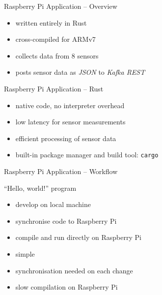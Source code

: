 \begin{frame}{Raspberry Pi Application -- Overview}
  \begin{itemize}
    \item written entirely in Rust
    \item cross-compiled for ARMv7
    \item collects data from 8 sensors
    \item posts sensor data as \textit{JSON} to \textit{Kafka REST}
  \end{itemize}
\end{frame}

\begin{frame}{Raspberry Pi Application -- Rust}
  \begin{itemize}
    \item native code, no interpreter overhead
    \item low latency for sensor measurements
    \item efficient processing of sensor data
    \item built-in package manager and build tool: \texttt{cargo}
  \end{itemize}
\end{frame}

\begin{frame}{Raspberry Pi Application -- Workflow}
  \begin{block}{“Hello, world!” program}
    \begin{itemize}
      \item develop on local machine
      \item synchronise code to Raspberry Pi
      \item compile and run directly on Raspberry Pi
    \end{itemize}
  \end{block}
  \begin{block}{}
    \begin{itemize}
      \item simple
    \end{itemize}
  \end{block}
  \begin{block}{}
    \begin{itemize}
      \item synchronisation needed on each change
      \item slow compilation on Raspberry Pi
    \end{itemize}
  \end{block}
\end{frame}

